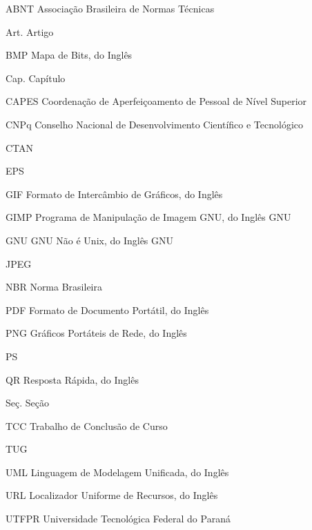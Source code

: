 
\begin{AcronymsList}%
\item[ABNT] Associação Brasileira de Normas Técnicas
\item[Art.] Artigo
\item[BMP] Mapa de Bits, do Inglês 
\item[Cap.] Capítulo
\item[CAPES] Coordenação de Aperfeiçoamento de Pessoal de Nível Superior
\item[CNPq] Conselho Nacional de Desenvolvimento Científico e Tecnológico
\item[CTAN] 
\item[EPS] 
\item[GIF] Formato de Intercâmbio de Gráficos, do Inglês 
\item[GIMP] Programa de Manipulação de Imagem GNU, do Inglês GNU 
\item[GNU] GNU Não é Unix, do Inglês GNU 
\item[JPEG] 
\item[NBR] Norma Brasileira
\item[PDF] Formato de Documento Portátil, do Inglês 
\item[PNG] Gráficos Portáteis de Rede, do Inglês 
\item[PS] 
\item[QR] Resposta Rápida, do Inglês 
\item[Seç.] Seção
\item[TCC] Trabalho de Conclusão de Curso
\item[TUG] 
\item[UML] Linguagem de Modelagem Unificada, do Inglês 
\item[URL] Localizador Uniforme de Recursos, do Inglês 
\item[UTFPR] Universidade Tecnológica Federal do Paraná
\end{AcronymsList}
